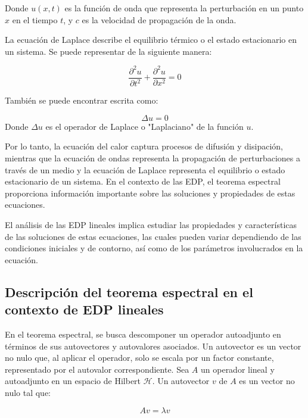 \documentclass{article}
\begin{document}
        Donde $u(x,t)$ es la función de onda que representa la perturbación en un punto $x$ en el tiempo $t$, y $c$ es la velocidad de propagación de la onda.

    La ecuación de Laplace describe el equilibrio térmico o el estado estacionario en un sistema. Se puede representar de la siguiente manera:

        \begin{equation}
            \frac{\partial^2 u}{\partial t^2} + \frac{\partial^2 u}{\partial x^2}= 0
        \end{equation}

    También se puede encontrar escrita como:

        \begin{equation}
            \Delta u = 0
            \end{equation}
    Donde $\Delta u$ es el operador de Laplace o "Laplaciano" de la función $u$.

    Por lo tanto, la ecuación del calor captura procesos de difusión y disipación, mientras que la ecuación de ondas representa la propagación de perturbaciones a través de un medio y la ecuación de Laplace representa el equilibrio o estado estacionario de un sistema. En el contexto de las EDP, el teorema espectral proporciona información importante sobre las soluciones y propiedades de estas ecuaciones.

    El análisis de las EDP lineales implica estudiar las propiedades y características de las soluciones de estas ecuaciones, las cuales pueden variar dependiendo de las condiciones iniciales y de contorno, así como de los parámetros involucrados en la ecuación.

    \subsection{Descripción del teorema espectral en el contexto de EDP lineales}

    En el teorema espectral, se busca descomponer un operador autoadjunto en términos de sus autovectores y autovalores asociados. Un autovector es un vector no nulo que, al aplicar el operador, solo se escala por un factor constante, representado por el autovalor correspondiente.
    Sea $A$ un operador lineal y autoadjunto en un espacio de Hilbert $\mathcal{H}$. Un autovector $v$ de $A$ es un vector no nulo tal que:

    \begin{equation}
    Av = \lambda v
    \end{equation}
    
\end{document}

